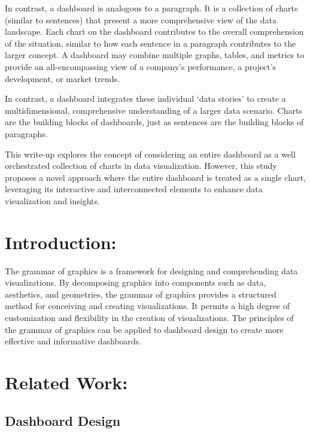 \documentclass[print]{nuthesis}
\begin{document}
In contrast, a dashboard is analogous to a paragraph.
It is a collection of charts (similar to sentences) that present a more comprehensive view of the data landscape.
Each chart on the dashboard contributes to the overall comprehension of the situation, similar to how each sentence in a paragraph contributes to the larger concept.
A dashboard may combine multiple graphs, tables, and metrics to provide an all-encompassing view of a company's performance, a project's development, or market trends.

In contrast, a dashboard integrates these individual `data stories' to create a multidimensional, comprehensive understanding of a larger data scenario.
Charts are the building blocks of dashboards, just as sentences are the building blocks of paragraphs.

This write-up explores the concept of considering an entire dashboard as a well orchestrated collection of charts in data visualization.
However, this study proposes a novel approach where the entire dashboard is treated as a single chart, leveraging its interactive and interconnected elements to enhance data visualization and insights.

\hypertarget{introduction-2}{%
\section{Introduction:}\label{introduction-2}}

The grammar of graphics is a framework for designing and comprehending data visualizations.
By decomposing graphics into components such as data, aesthetics, and geometries, the grammar of graphics provides a structured method for conceiving and creating visualizations.
It permits a high degree of customization and flexibility in the creation of visualizations.
The principles of the grammar of graphics can be applied to dashboard design to create more effective and informative dashboards.

\hypertarget{related-work}{%
\section{Related Work:}\label{related-work}}

\hypertarget{dashboard-design-1}{%
\subsection{Dashboard Design}\label{dashboard-design-1}}
\end{document}
